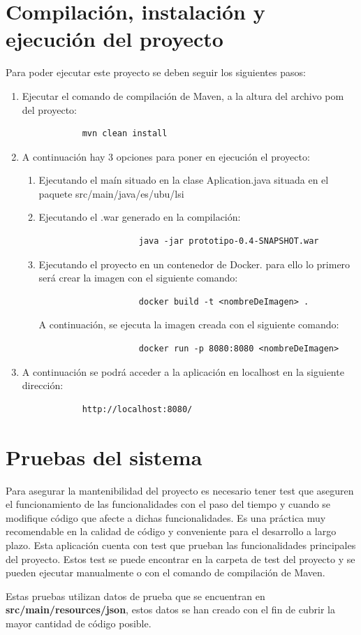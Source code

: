 \section{Compilación, instalación y ejecución del proyecto}
Para poder ejecutar este proyecto se deben seguir los siguientes pasos:
\begin{enumerate}
    \item Ejecutar el comando de compilación de Maven, a la altura del archivo pom del proyecto:
        \begin{verbatim}
            mvn clean install
        \end{verbatim}
    \item A continuación hay 3 opciones para poner en ejecución el proyecto:
        \begin{enumerate}
            \item Ejecutando el maín situado en la clase Aplication.java situada en el paquete src/main/java/es/ubu/lsi
            \item Ejecutando el .war generado en la compilación:
                \begin{verbatim}
                    java -jar prototipo-0.4-SNAPSHOT.war
                \end{verbatim}
            \item Ejecutando el proyecto en un contenedor de Docker. para ello lo primero será crear la imagen con el siguiente comando:
                \begin{verbatim}
                    docker build -t <nombreDeImagen> .
                \end{verbatim}
            A continuación, se ejecuta la imagen creada con el siguiente comando:
                \begin{verbatim}
                    docker run -p 8080:8080 <nombreDeImagen>
                \end{verbatim}
        \end{enumerate}
        \item A continuación se podrá acceder a la aplicación en localhost en la siguiente dirección:
        \begin{verbatim}
            http://localhost:8080/
        \end{verbatim}
\end{enumerate}


\section{Pruebas del sistema}
Para asegurar la mantenibilidad del proyecto es necesario tener test que aseguren el funcionamiento de las funcionalidades con el paso del tiempo y cuando se modifique código que afecte a dichas funcionalidades. Es una práctica muy recomendable en la calidad de código y conveniente para el desarrollo a largo plazo. Esta aplicación cuenta con test que prueban las funcionalidades principales del proyecto. Estos test se puede encontrar en la carpeta de test del proyecto y se pueden ejecutar manualmente o con el comando de compilación de Maven. 

Estas pruebas utilizan datos de prueba que se encuentran en \textbf{src/main/resources/json}, estos datos se han creado con el fin de cubrir la mayor cantidad de código posible.
